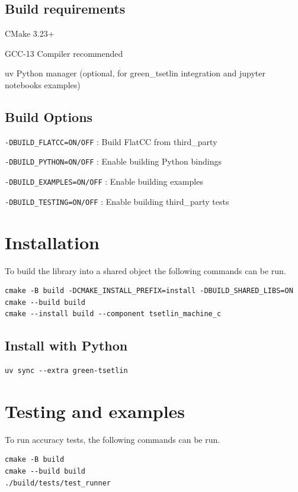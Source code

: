 \documentclass[english]{aghengthesis} %
\begin{document}
\subsection{Build requirements}
\begin{compactitem}
    \item CMake 3.23+
    \item GCC-13 Compiler recommended
    \item uv Python manager (optional, for green\_tsetlin integration and jupyter notebooks examples)
\end{compactitem}

\subsection{Build Options}
\begin{compactitem}
    \item \texttt{-DBUILD\_FLATCC=ON/OFF} : Build FlatCC from third\_party
    \item \texttt{-DBUILD\_PYTHON=ON/OFF} : Enable building Python bindings
    \item \texttt{-DBUILD\_EXAMPLES=ON/OFF} : Enable building examples
    \item \texttt{-DBUILD\_TESTING=ON/OFF} : Enable building third\_party tests
\end{compactitem}


\section{Installation}
To build the library into a shared object the following commands can be run.
\begin{lstlisting}[style=cli]
cmake -B build -DCMAKE_INSTALL_PREFIX=install -DBUILD_SHARED_LIBS=ON
cmake --build build
cmake --install build --component tsetlin_machine_c
\end{lstlisting}

\subsection{Install with Python}
\begin{lstlisting}[style=cli]
uv sync --extra green-tsetlin
\end{lstlisting}

\section{Testing and examples}
To run accuracy tests, the following commands can be run.
\begin{lstlisting}[style=cli]
cmake -B build
cmake --build build
./build/tests/test_runner
\end{lstlisting}
\end{document}
